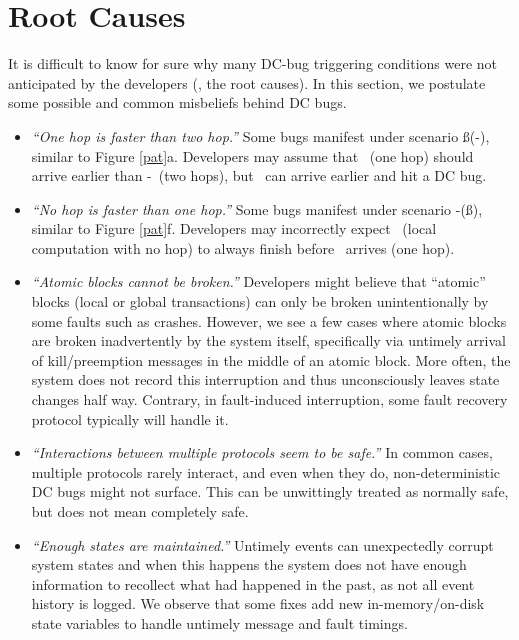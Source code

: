 \section{Root Causes}
\label{sec-root}

It is difficult to know for sure why many DC-bug triggering conditions
were not anticipated by the developers (\ie, the root causes).  In
this section, we postulate some possible and common misbeliefs behind
DC bugs.

\begin{itemize}

\item {\it ``One hop is faster than two hop.''}
Some bugs manifest under scenario \mbc\ss(\mba-\mac), similar to Figure
\ref{pat}a.  Developers may assume that \mbc\ (one hop) should arrive
earlier than \mba-\mac\ (two hops), but
\mac\ can arrive earlier and hit a DC bug.


\item {\it ``No hop is faster than one hop.''}
Some bugs manifest under
scenario \mba-(\lbp\ss\mab), similar to Figure \ref{pat}f.  Developers
may incorrectly expect \lbp\ (local computation with no hop) to always
finish before \mab\ arrives (one hop).  

\item {\it ``Atomic blocks cannot be broken.''}
Developers might believe that ``atomic'' blocks (local or global
transactions) 
can only be broken unintentionally by some faults such as crashes.
However, we see a few cases where atomic blocks are broken inadvertently
by the system itself, specifically via untimely arrival of
kill/preemption messages in the middle of an atomic block.
More often, the system does not record
this interruption
and thus unconsciously leaves state changes half way.  Contrary, in
fault-induced interruption, some fault recovery protocol typically
will handle it.


\item {\it ``Interactions between multiple protocols seem to be
  safe.''} In common cases, multiple protocols rarely interact, and
even when they do, non-deterministic DC bugs might not surface.  This can
be unwittingly treated as normally safe, but does not mean
completely safe.


\fi


\item {\it ``Enough states are maintained.''}  Untimely events can
unexpectedly corrupt system states and when this happens the system
does not have enough information to recollect what had happened in the
past, as not all event history is logged.  We observe that some fixes
add new in-memory/on-disk state variables to handle
untimely message and fault timings.

\end{itemize}




